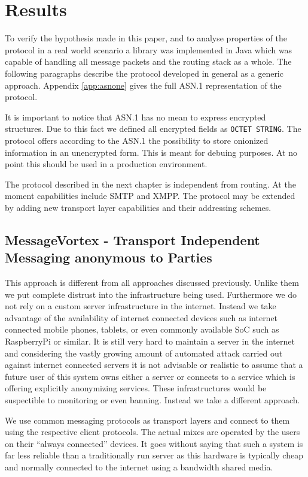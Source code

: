 
\part{Results}
To verify the hypothesis made in this paper, and to analyse properties of the protocol in a real world scenario a library was implemented in Java which was capable of handling all message packets and the routing stack as a whole. The following paragraphs describe the protocol developed in general as a generic approach. Appendix \ref{app:asnone} gives the full ASN.1 representation of the protocol. 

It is important to notice that ASN.1 has no mean to express encrypted structures. Due to this fact we defined all encrypted fields as \verb|OCTET STRING|. The protocol offers according to the ASN.1 the possibility to store onionized information in an unencrypted form. This is meant for debuing purposes. At no point this should be used in a production environment.

The protocol described in the next chapter is independent from routing. At the moment capabilities include SMTP and XMPP. The protocol may be extended by adding new transport layer capabilities and their addressing schemes.

\chapter{MessageVortex - Transport Independent Messaging anonymous to  Parties}
This approach is different from all approaches discussed previously. Unlike them we put complete distrust into the infrastructure being used. Furthermore we do not rely on a custom server infrastructure in the internet. Instead we take advantage of the availability of internet connected devices such as internet connected mobile phones, tablets, or even commonly available SoC such as RaspberryPi or similar. It is still very hard to maintain a server in the internet and considering the vastly growing amount of automated attack carried out against internet connected servers it is not advisable or realistic to assume that a future user of this system owns either a server or connects to a service which is offering explicitly anonymizing services. These infrastructures would be suspectible to monitoring or even banning. Instead we take a different approach.

We use common messaging protocols as transport layers and connect to them using the respective client protocols. The actual mixes are operated by the users on their ``always connected'' devices. It goes without saying that such a system is far less reliable than a traditionally run server as this hardware is typically cheap and normally connected to the internet using a bandwidth shared media.

